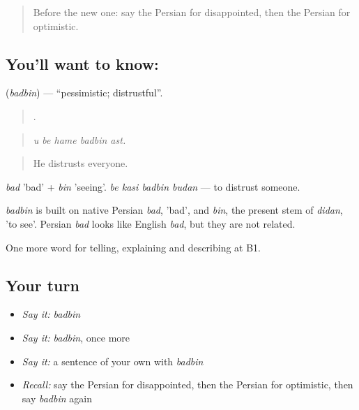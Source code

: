 \label{lesson:FA-C487-badbin}



\begin{quote}
Before the new one: say the Persian for disappointed, then the Persian for optimistic.
\end{quote}

\subsection*{You'll want to know: }
\textbf{} (\emph{badbin}) — \textquotedblleft{}pessimistic; distrustful\textquotedblright{}.

\begin{quote}
    .
\end{quote}

\begin{quote}
\emph{u be hame badbin ast.}
\end{quote}

\begin{quote}
He distrusts everyone.
\end{quote}

\emph{bad} 'bad' + \emph{bin} 'seeing'. \emph{be kasi badbin budan} — to distrust someone.

\begin{cousinweb}
\emph{badbin} is built on native Persian \emph{bad}, 'bad', and \emph{bin}, the present stem of \emph{didan}, 'to see'. Persian \emph{bad} looks like English \emph{bad}, but they are not related.
\end{cousinweb}

\begin{grammarlens}[title={What you've built}]
One more word for telling, explaining and describing at B1.
\end{grammarlens}

\subsection*{Your turn}
\begin{itemize}
\raggedright
  \item \emph{Say it:} \emph{badbin}
  \item \emph{Say it:} \emph{badbin}, once more
  \item \emph{Say it:} a sentence of your own with \emph{badbin}
  \item \emph{Recall:} say the Persian for disappointed, then the Persian for optimistic, then say \emph{badbin} again
\end{itemize}

